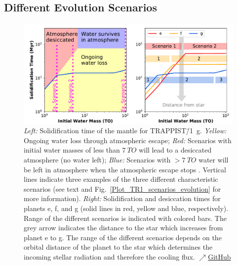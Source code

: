 \documentclass[paper=letterpaper,fontsize=12pt,oneside,twocolumn]{article}
\begin{document}
\subsection{Different Evolution Scenarios}

\begin{figure}[h]
    \centering
    \includegraphics[width=\textwidth]{BarthFig5.pdf}
    \caption{\textit{Left:} Solidification time of the mantle for TRAPPIST\=/1~g. \textit{Yellow:} Ongoing water loss through atmospheric escape; \textit{Red:} Scenarios with initial water masses of less than $\SI{7}{TO}$ will lead to a desiccated atmosphere (no water left); \textit{Blue:} Scenarios with $>\SI{7}{TO}$ water will be left in atmosphere when the atmospheric escape stops \citep{Kopparapu2013}. Vertical lines indicate three examples of the three different characteristic scenarios (see text and Fig.~\ref{Plot_TR1_scenarios_evolution} for more information). \textit{Right:} Solidification and desiccation times for planets e, f, and g (solid lines in red, yellow and blue, respectively). Range of the different scenarios is indicated with colored bars. The grey arrow indicates the distance to the star which increases from planet e to g. The range of the different scenarios depends on the orbital distance of the planet to the star which determines the incoming stellar radiation and therefore the cooling flux.
    \href{https://github.com/pbfeu/Trappist1_MagmOc/tree/public/Fig_Trappist1g_scenarios}{$\nearrow$GitHub}
    }
    \label{Summary_Trappist1_scenarios_g}
\end{figure}
\end{document}
